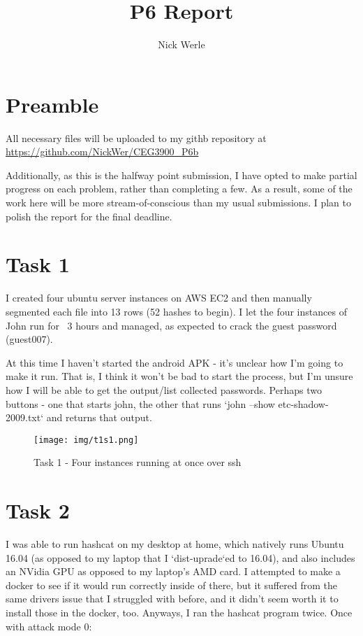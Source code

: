 \documentclass{article}
\title{P6 Report}
\author{Nick Werle}
\begin{document}
\maketitle
\section{Preamble}
All necessary files will be uploaded to my githb repository at \url{https://github.com/NickWer/CEG3900_P6b}

Additionally, as this is the halfway point submission, I have opted to make partial progress on each problem, rather than completing a few.
As a result, some of the work here will be more stream-of-conscious than my usual submissions. I plan to polish the report for the final deadline.

\section{Task 1}
I created four ubuntu server instances on AWS EC2 and then manually segmented each file into 13 rows (52 hashes to begin).
I let the four instances of John run for ~3 hours and managed, as expected to crack the guest password (guest007).

At this time I haven't started the android APK - it's unclear how I'm going to make it run.
That is, I think it won't be bad to start the process, but I'm unsure how I will be able to get the output/list collected passwords.
Perhaps two buttons - one that starts john, the other that runs `john --show etc-shadow-2009.txt` and returns that output.

	\begin{figure}[ht]
        \centerline{
            \texttt{[image: img/t1s1.png]}
        }
		\centering
		\caption{Task 1 - Four instances running at once over ssh}
	\end{figure}


\clearpage

\section{Task 2}
I was able to run hashcat on my desktop at home, which natively runs Ubuntu 16.04 (as opposed to my laptop that I `dist-uprade`ed to 16.04), and also includes an NVidia GPU as opposed to my laptop's AMD card.
I attempted to make a docker to see if it would run correctly inside of there, but it suffered from the same drivers issue that I struggled with before, and it didn't seem worth it to install those in the docker, too.
Anyways, I ran the hashcat program twice. Once with attack mode 0:
\end{document}
